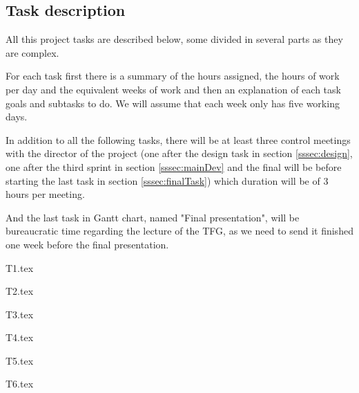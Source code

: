 \subsection{Task description}
\label{ssec:tasks}
All this project tasks are described below, some divided in several parts as they are complex. 

For each task first there is a summary of the hours assigned, the hours of work per day and the equivalent weeks of work and then an explanation of each task goals and subtasks to do. We will assume that each week only has five working days. 

In addition to all the following tasks, there will be at least three control meetings with the director of the project (one after the design task in section \ref{sssec:design}, one after the third sprint in section \ref{sssec:mainDev} and the final will be before starting the last task in section \ref{sssec:finalTask}) which duration will be of 3 hours per meeting. 

And the last task in Gantt chart, named "Final presentation", will be bureaucratic time regarding the lecture of the TFG, as we need to send it finished one week before the final presentation.

\pagebreak
{T1.tex}

\pagebreak
{T2.tex}

\pagebreak
{T3.tex}

\pagebreak
{T4.tex}

\pagebreak
{T5.tex}

\pagebreak
{T6.tex}

